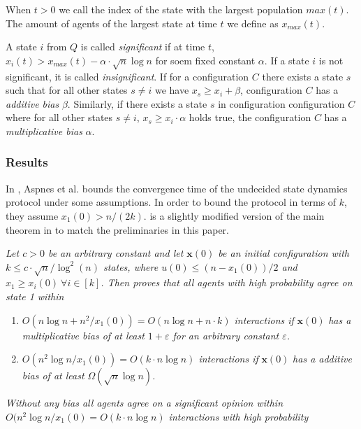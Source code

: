 When $t > 0$ we call the index of the state with the largest population $max(t)$. The amount of agents of the largest state at time $t$ we define as $x_{max}(t)$. 

A state $i$ from $Q$ is called \emph{significant} if at time $t$, $x_i(t) > x_{max}(t) - \alpha \cdot \sqrt{n} \log n$ for soem fixed constant $\alpha$. If a state $i$ is not significant, it is called \emph{insignificant}. If for a configuration $C$ there exists a state $s$ such that for all other states $s \neq i$ we have $x_s \geq x_i + \beta$, configuration $C$ has a \emph{additive bias} $\beta$. Similarly, if there exists a state $s$ in configuration configuration $C$ where for all other states $s \neq i$, 
$x_s \geq x_i \cdot \alpha$ holds true, the configuration $C$ has a \emph{multiplicative bias} $\alpha$. 

\subsubsection{Results}

In \cite{AspnesFastConverganceOfKOpinion2023}, Aspnes et al. bounds the convergence time of the undecided state dynamics protocol under some assumptions. In order to bound the protocol in terms of $k$, they assume $x_1(0) > n/(2k)$.  is a slightly modified version of the main theorem in \cite{AspnesFastConverganceOfKOpinion2023} to match the preliminaries in this paper.

 \begin{theorem}
    \textit{Let $c > 0$ be an arbitrary constant and let $\textbf{x}(0)$ be an initial configuration with $k \leq c \cdot \sqrt{n}/\log^2(n) $ states, where $u(0) \leq (n - x_1(0))/2$ and $x_1 \geq x_i(0) \ \forall i \in [k]$. Then \cite{AspnesFastConverganceOfKOpinion2023} proves that all agents with high probability agree on state 1 within}

    \begin{enumerate}
        \item \textit{$O(n \log n + n^2 / x_1(0)) = O(n \log n + n \cdot k)$ interactions if }$\textbf{x}(0)$ \textit{has a multiplicative bias  of at least $1 + \varepsilon$ for an arbitrary constant $\varepsilon$.} \label{theorem5_1}
        \item \textit{$O(n^2 \log n/x_1(0)) = O(k \cdot n \log n)$ interactions if} $\textbf{x}(0)$ \textit{has a additive bias  of at least $\Omega(\sqrt{n} \log n)$.} \label{theorem5_2}
    \end{enumerate}

    \textit{Without any bias all agents agree on a significant opinion within $O(n^2 \log n / x_1(0) = O(k \cdot n \log n)$ interactions with high probability}
 \end{theorem} 


